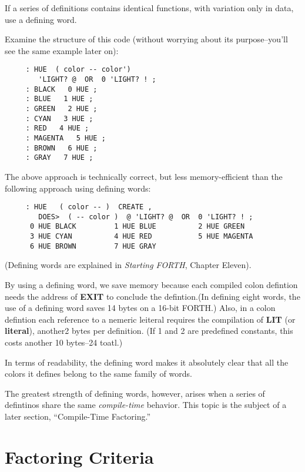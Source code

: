 \begin{tip}
If a series of definitions contains identical functions, with variation only in data, use a defining word.
\end{tip}
Examine the structure of this code (without worrying about its purpose--you'll see the same example later on):

\begin{verbatim}
     : HUE  ( color -- color') 
        'LIGHT? @  OR  0 'LIGHT? ! ;
     : BLACK   0 HUE ;
     : BLUE   1 HUE ;
     : GREEN   2 HUE ;
     : CYAN   3 HUE ;
     : RED   4 HUE ;
     : MAGENTA   5 HUE ;
     : BROWN   6 HUE ;
     : GRAY   7 HUE ;
\end{verbatim}

\noindent The above approach is technically correct, but less memory-efficient than the following approach using defining words:

\begin{verbatim}
     : HUE   ( color -- )  CREATE ,
        DOES>  ( -- color )  @ 'LIGHT? @  OR  0 'LIGHT? ! ;
      0 HUE BLACK         1 HUE BLUE          2 HUE GREEN
      3 HUE CYAN          4 HUE RED           5 HUE MAGENTA
      6 HUE BROWN         7 HUE GRAY
\end{verbatim}

\noindent 
(Defining words are explained in \emph{Starting FORTH}, Chapter Eleven).

By using a defining word, we save memory because each compiled colon defintion needs the address of \textbf{EXIT} to conclude the defintion.(In defining eight words, the use of a defining word saves 14 bytes on a 16-bit FORTH.) Also, in a colon defintion each reference to a nemeric leiteral requires the compilation of \textbf{LIT} (or \textbf{literal}), another2 bytes per definition. (If 1 and 2 are predefined constants, this costs another 10 bytes--24 toatl.)

In terms of readability, the defining word makes it absolutely clear that all the colors it defines belong to the same family of words.

The greatest strength of defining words, however, arises when a series of defintinos share the same \emph{compile-time} behavior. This topic is the subject of a later section, ``Compile-Time Factoring.''

\section{Factoring Criteria}

